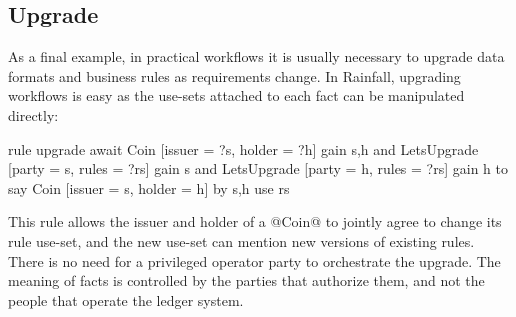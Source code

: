 \subsection{Upgrade}
\label{s:Upgrade}
As a final example, in practical workflows it is usually necessary to upgrade data formats and business rules as requirements change. In Rainfall, upgrading workflows is easy as the use-sets attached to each fact can be manipulated directly:

\begin{small}
\begin{code}
  rule   upgrade
  await  Coin [issuer = ?s, holder = ?h]      gain {s,h}
     and LetsUpgrade [party = s, rules = ?rs] gain {s}
     and LetsUpgrade [party = h, rules = ?rs] gain {h}
  to say Coin [issuer = s, holder = h]
      by {s,h} use rs
\end{code}
\end{small}

This rule allows the issuer and holder of a @Coin@ to jointly agree to change its rule use-set, and the new use-set can mention new versions of existing rules. There is no need for a privileged operator party to orchestrate the upgrade. The meaning of facts is controlled by the parties that authorize them, and not the people that operate the ledger system.






